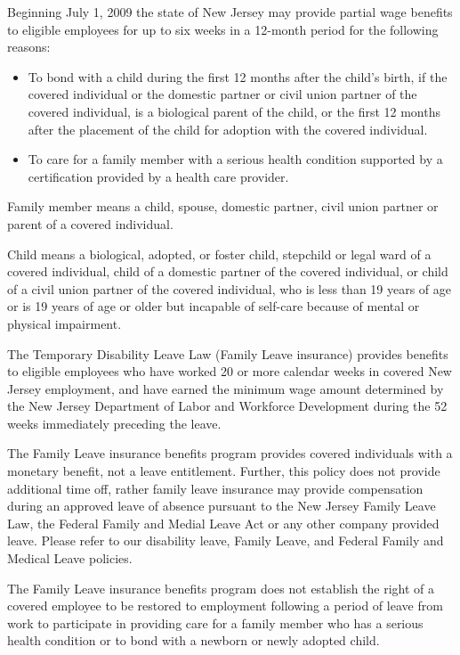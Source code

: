 \documentclass{book}
\begin{document}
Beginning July 1, 2009 the state of New Jersey may provide partial wage benefits to eligible employees for up to six weeks in a 12-month period for the following reasons:

\begin{itemize} \item To bond with a child during the first 12 months after the child's birth, if the covered individual or the domestic partner or civil union partner of the covered individual, is a biological parent of the child, or the first 12 months after the placement of the child for adoption with the covered individual.

\item To care for a family member with a serious health condition supported by a certification provided by a health care provider. \end{itemize}

Family member means a child, spouse, domestic partner, civil union partner or parent of a covered individual.

Child means a biological, adopted, or foster child, stepchild or legal ward of a covered individual, child of a domestic partner of the covered individual, or child of a civil union partner of the covered individual, who is less than 19 years of age or is 19 years of age or older but incapable of self-care because of mental or physical impairment.

The Temporary Disability Leave Law (Family Leave insurance) provides benefits to eligible employees who have worked 20 or more calendar weeks in covered New Jersey employment, and have earned the minimum wage amount determined by the New Jersey Department of Labor and Workforce Development during the 52 weeks immediately preceding the leave.

The Family Leave insurance benefits program provides covered individuals with a monetary benefit, not a leave entitlement. Further, this policy does not provide additional time off, rather family leave insurance may provide compensation during an approved leave of absence pursuant to the New Jersey Family Leave Law, the Federal Family and Medial Leave Act or any other company provided leave. Please refer to our disability leave, Family Leave, and Federal Family and Medical Leave policies.

The Family Leave insurance benefits program does not establish the right of a covered employee to be restored to employment following a period of leave from work to participate in providing care for a family member who has a serious health condition or to bond with a newborn or newly adopted child.
\end{document}
